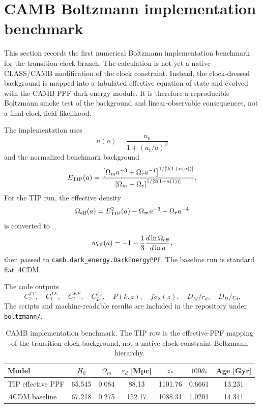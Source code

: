 \section{CAMB Boltzmann implementation benchmark}
\label{sec:camb-boltzmann-benchmark}

This section records the first numerical Boltzmann implementation benchmark for the transition-clock branch. The calculation is not yet a native CLASS/CAMB modification of the clock constraint. Instead, the clock-dressed background is mapped into a tabulated effective equation of state and evolved with the CAMB PPF dark-energy module. It is therefore a reproducible Boltzmann smoke test of the background and linear-observable consequences, not a final clock-field likelihood.

The implementation uses
\begin{equation}
 n(a)=\frac{n_0}{1+(a_t/a)^\beta}
\end{equation}
and the normalized benchmark background
\begin{equation}
 E_{\rm TIP}(a)=
 \frac{\left[\Omega_m a^{-3}+\Omega_r a^{-4}\right]^{1/[2(1+n(a))]}}
 {\left[\Omega_m+\Omega_r\right]^{1/[2(1+n(1))]}} .
\end{equation}
For the TIP run, the effective density
\begin{equation}
 \Omega_{\rm eff}(a)=E_{\rm TIP}^2(a)-\Omega_m a^{-3}-\Omega_r a^{-4}
\end{equation}
is converted to
\begin{equation}
 w_{\rm eff}(a)=-1-\frac{1}{3}\frac{d\ln\Omega_{\rm eff}}{d\ln a},
\end{equation}
then passed to \texttt{camb.dark\_energy.DarkEnergyPPF}. The baseline run is standard flat $\Lambda$CDM.

The code outputs
\begin{equation}
 C_\ell^{TT},\quad C_\ell^{TE},\quad C_\ell^{EE},\quad C_L^{\phi\phi},\quad
 P(k,z),\quad f\sigma_8(z),\quad D_M/r_d,\quad D_H/r_d .
\end{equation}
The scripts and machine-readable results are included in the repository under \texttt{boltzmann/}.

\begin{table}[t]
\caption{CAMB implementation benchmark. The TIP row is the effective-PPF mapping of the transition-clock background, not a native clock-constraint Boltzmann hierarchy.}
\label{tab:camb-implementation-benchmark}
\begin{ruledtabular}
\begin{tabular}{lcccccc}
Model & $H_0$ & $\Omega_m$ & $r_d$ [Mpc] & $z_\ast$ & $100\theta_\ast$ & Age [Gyr]\\
\hline
TIP effective PPF & 65.545 & 0.084 & 88.13 & 1101.76 & 0.6661 & 13.231\\
$\Lambda$CDM baseline & 67.218 & 0.275 & 152.17 & 1088.31 & 1.0201 & 14.341
\end{tabular}
\end{ruledtabular}
\end{table}

